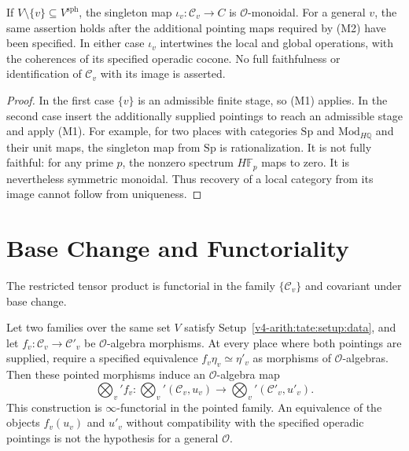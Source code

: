 \begin{corollary}
\label{v4-arith:tate:cor:uniqueness-fibers}
If \(V\setminus\{v\}\subseteq V^{\mathrm{sph}}\), the singleton
map \(\iota_v:\mathcal C_v\to C\) is \(\mathcal O\)-monoidal.
For a general \(v\), the same assertion holds after the additional
pointing maps required by (M2) have been specified. In either
case \(\iota_v\) intertwines the local and global operations,
with the coherences of its specified operadic cocone. No full
faithfulness or identification of \(\mathcal C_v\) with its image
is asserted.
\end{corollary}

\begin{proof}
In the first case \(\{v\}\) is an admissible finite stage, so (M1)
applies. In the second case insert the additionally supplied
pointings to reach an admissible stage and apply (M1).
For example, for two places with categories \(\mathrm{Sp}\) and
\(\mathrm{Mod}_{H\mathbb Q}\) and their unit maps, the singleton
map from \(\mathrm{Sp}\) is rationalization. It is not fully
faithful: for any prime \(p\), the nonzero spectrum
\(H\mathbb F_p\) maps to zero. It is nevertheless symmetric
monoidal. Thus recovery of a local category from its image
cannot follow from uniqueness.
\end{proof}

\section{Base Change and Functoriality}
\label{v4-arith:tate:base-change}

The restricted tensor product is functorial in the family
\(\{\mathcal{C}_{v}\}\) and covariant under base change.

\begin{proposition}
\label{v4-arith:tate:prop:functoriality-family}
Let two families over the same set \(V\) satisfy
Setup~\ref{v4-arith:tate:setup:data}, and let
\(f_v:\mathcal C_v\to\mathcal C'_v\) be
\(\mathcal O\)-algebra morphisms. At every place where both
pointings are supplied, require a specified equivalence
\(f_v\eta_v\simeq\eta'_v\) as morphisms of \(\mathcal O\)-algebras.
Then these pointed morphisms induce an \(\mathcal O\)-algebra map
\[
 \bigotimes_v' f_v:
 \bigotimes_v'(\mathcal C_v,u_v)\longrightarrow
 \bigotimes_v'(\mathcal C'_v,u'_v).
\]
This construction is \(\infty\)-functorial in the pointed family.
An equivalence of the objects \(f_v(u_v)\) and \(u'_v\) without
compatibility with the specified operadic pointings is not the
hypothesis for a general \(\mathcal O\).
\end{proposition}

